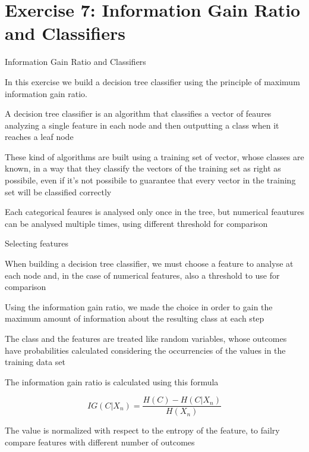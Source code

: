 \section{Exercise 7: Information Gain Ratio and Classifiers}

\begin{frame}{Information Gain Ratio and Classifiers}

In this exercise we build a decision tree classifier using the principle of maximum information gain ratio. 

A decision tree classifier is an algorithm that classifies a vector of feaures analyzing a single feature in each node and then outputting a class when it reaches a leaf node

These kind of algorithms are built using a training set of vector, whose classes are known, in a way that they classify the vectors of the training set as right as possibile, even if it's not possibile to guarantee that every vector in the training set will be classified correctly

Each categorical feaures is analysed only once in the tree, but numerical feautures can be analysed multiple times, using different threshold for comparison

\end{frame}


\begin{frame}{Selecting features}
	
When building a decision tree classifier, we must choose a feature to analyse at each node and, in the case of numerical features, also a threshold to use for comparison

Using the information gain ratio, we made the choice in order to gain the maximum amount of information about the resulting class at each step

The class and the features are treated like random variables, whose outcomes have probabilities calculated considering the occurrencies of the values in the training data set

The information gain ratio is calculated using this formula 

\[ 
IG(C|X_n) = \frac{H(C) - H(C|X_n)}{H(X_n)}
\]

The value is normalized with respect to the entropy of the feature, to failry compare features with different number of outcomes

\end{frame}



